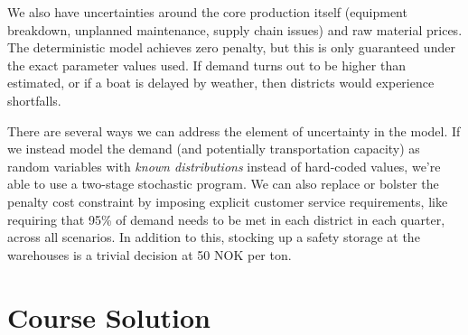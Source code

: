 \documentclass[10pt]{article}
\begin{document}
We also have uncertainties around the core production itself (equipment breakdown, unplanned maintenance, supply chain issues) and raw material prices. The deterministic model achieves zero penalty, but this is only guaranteed under the exact parameter values used. If demand turns out to be higher than estimated, or if a boat is delayed by weather, then districts would experience shortfalls.

There are several ways we can address the element of uncertainty in the model. If we instead model the demand (and potentially transportation capacity) as random variables with \textit{known distributions} instead of hard-coded values, we're able to use a two-stage stochastic program\footnotemark. We can also replace or bolster the penalty cost constraint by imposing explicit customer service requirements, like requiring that 95\% of demand needs to be met in each district in each quarter, across all scenarios. In addition to this, stocking up a safety storage at the warehouses is a trivial decision at 50 NOK per ton. 
\newpage 
\section{Course Solution}
\end{document}
